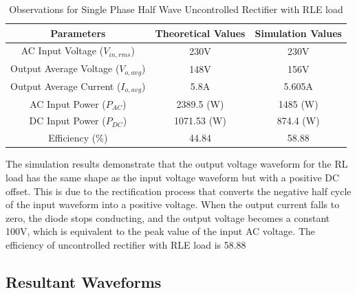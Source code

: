 \begin{table}[h]
    \renewcommand{\arraystretch}{1.3}

    \label{table_observation_single-phase-half-wave-uncontrolled-rectifier-with-RLE-load}
    \centering
    \begin{tabular}{|c|c|c|}
        \hline
        Parameters                              & Theoretical Values & Simulation Values \\
        \hline
        \hline
        AC Input Voltage ($ V_{in,rms} $)       & 230V               & 230V              \\
        \hline
        Output Average Voltage ($ V_{o,avg} $)  & 148V               & 156V            \\
        \hline
        Output Average Current ($ I_{o,avg}  $) & 5.8A               & 5.605A            \\
        \hline
        AC Input Power ($ P_{AC}  $)            & 2389.5 (W)         & 1485 (W)          \\
        \hline
        DC Input Power ($ P_{DC}  $)            & 1071.53 (W)        & 874.4 (W)         \\
        \hline
        Efficiency (\%)                         & 44.84              & 58.88             \\
        \hline
    \end{tabular}
    \caption{Observations for Single Phase Half Wave Uncontrolled Rectifier with RLE load}
\end{table}


The simulation results demonstrate that the output voltage waveform for the RL load has the same shape as the input voltage waveform but with a positive DC offset. This is due to the rectification process that converts the negative half cycle of the input waveform into a positive voltage. When the output current falls to zero, the diode stops conducting, and the output voltage becomes a constant 100V, which is equivalent to the peak value of the input AC voltage.
The efficiency of uncontrolled rectifier with RLE load is 58.88%

\pagebreak

\subsection{Resultant Waveforms}

